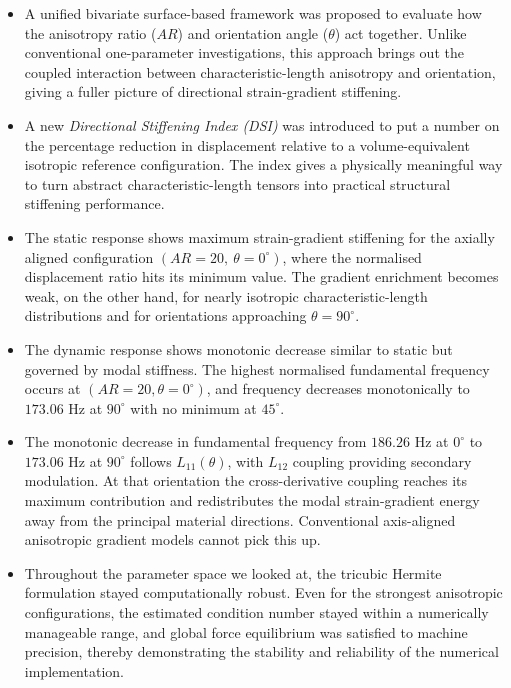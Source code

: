 \documentclass[final,3p,times,fleqn]{elsarticle}
\begin{document}
\begin{itemize}

\item A unified bivariate surface-based framework was proposed to
evaluate how the anisotropy ratio ($AR$) and orientation angle ($\theta$)
act together. Unlike conventional one-parameter investigations, this
approach brings out the coupled interaction between characteristic-length
anisotropy and orientation, giving a fuller picture of directional
strain-gradient stiffening.

\item A new \emph{Directional Stiffening Index (DSI)} was introduced to
put a number on the percentage reduction in displacement relative to a
volume-equivalent isotropic reference configuration. The index gives a
physically meaningful way to turn abstract characteristic-length tensors
into practical structural stiffening performance.

\item The static response shows maximum strain-gradient stiffening for
the axially aligned configuration $(AR = 20,\ \theta = 0^{\circ})$,
where the normalised displacement ratio hits its minimum value. The
gradient enrichment becomes weak, on the other hand, for nearly
isotropic characteristic-length distributions and for orientations
approaching $\theta = 90^{\circ}$.

\item The dynamic response shows monotonic decrease similar to static but governed by modal stiffness. The highest normalised fundamental frequency occurs at $(AR=20,\theta=0^{\circ})$, and frequency decreases monotonically to $173.06$ Hz at $90^{\circ}$ with no minimum at $45^{\circ}$.

\item The monotonic decrease in fundamental frequency from $186.26$ Hz at $0^{\circ}$ to $173.06$ Hz at $90^{\circ}$ follows $L_{11}(\theta)$, with $L_{12}$ coupling providing secondary modulation. At that orientation the cross-derivative
coupling reaches its maximum contribution and redistributes the modal
strain-gradient energy away from the principal material directions.
Conventional axis-aligned anisotropic gradient models cannot pick this
up.

\item Throughout the parameter space we looked at, the tricubic Hermite
formulation stayed computationally robust. Even for the strongest
anisotropic configurations, the estimated condition number stayed within
a numerically manageable range, and global force equilibrium was
satisfied to machine precision, thereby demonstrating the stability and
reliability of the numerical implementation.

\end{itemize}
\end{document}
